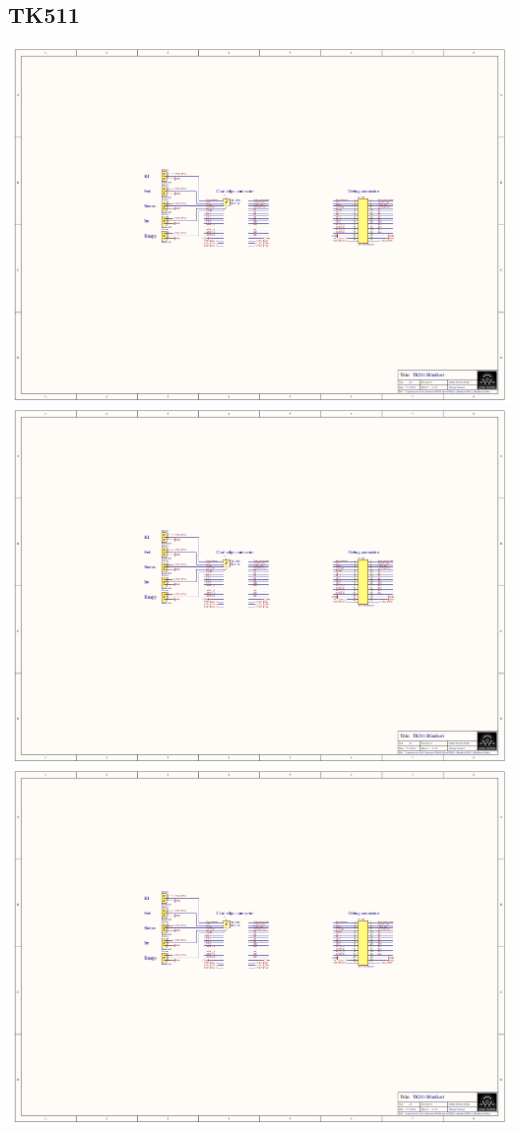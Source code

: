 \subsection{TK511}
\includegraphics[page=4,height=\textheight,width=\textwidth,keepaspectratio]{TK511_Blindkort.PDF}
\includegraphics[page=5,height=\textheight,width=\textwidth,keepaspectratio]{TK511_Blindkort.PDF}
\includegraphics[page=6,height=\textheight,width=\textwidth,keepaspectratio]{TK511_Blindkort.PDF}
